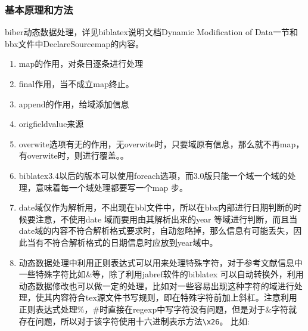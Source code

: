 \subsubsection{基本原理和方法}\label{sec:dynamic:modify}
biber动态数据处理，详见biblatex说明文档Dynamic Modification of Data一节和bbx文件中DeclareSourcemap的内容。
  \begin{enumerate}
    \item map的作用，对条目逐条进行处理
    \item final作用，当不成立map终止。
    \item append的作用，给域添加信息
    \item origfieldvalue来源
    \item overwite选项有无的作用，无overwite时，只要域原有信息，那么就不再map，有overwite时，则进行覆盖。。
    \item biblatex3.4以后的版本可以使用foreach选项，而3.0版只能一个域一个域的处理，意味着每一个域处理都要写一个map 步。
    \item date域仅作为解析用，不出现在bbl文件中，所以在bbx内部进行日期判断的时候要注意，不使用date 域而要用由其解析出来的year 等域进行判断，而且当date域的内容不符合解析格式要求时，自动忽略掉，那么信息有可能丢失，因此当有不符合解析格式的日期信息时应放到year域中。
    \item 动态数据处理中利用正则表达式可以用来处理特殊字符，对于参考文献信息中一些特殊字符比如\&等，除了利用jabref软件的biblatex 可以自动转换外，利用动态数据修改也可以做一定的处理，比如对一些容易出现这种字符的域进行处理，使其内容符合tex源文件书写规则，即在特殊字符前加上斜杠。注意利用正则表达式处理\%，\#时直接在regexp中写字符没有问题，但是对于\&字符就存在问题，所以对于该字符使用十六进制表示方法\verb|\x26|。 比如:

    \begin{texlist}
    \DeclareStyleSourcemap{
        \maps[datatype=bibtex]{
            \map[overwrite, foreach={title,booktitle,journaltitle,journal,publisher,address,location,institution,organization}]{
                \step[fieldsource=\regexp{$MAPLOOP}, match=\regexp{([^\\])\#}, replace=\regexp{$1\\\#}]
            }
            \map[overwrite, foreach={title,booktitle,journaltitle,journal,publisher,address,location,institution,organization}]{
                \step[fieldsource=\regexp{$MAPLOOP}, match=\regexp{([^\\])\%}, replace=\regexp{$1\\\%}]
            }
            \map[overwrite, foreach={title,booktitle,journaltitle,journal,publisher,%
            address,location,institution,organization}]{
                \step[fieldsource=\regexp{$MAPLOOP}, match=\regexp{([^\\])\x26}, replace=\regexp{$1\\\x26}]
            }
        }
    }


\end{texlist}
\end{enumerate}
